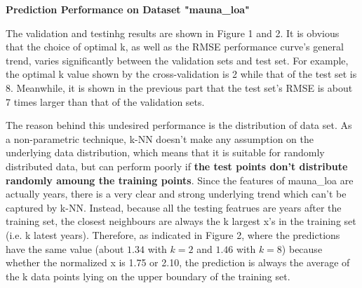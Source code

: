 \documentclass{article} %
\begin{document}
\vspace{0.2cm}

\textbf{Prediction Performance on Dataset "mauna\_loa"}

  The validation and testinhg results are shown in Figure 1 and 2. It is obvious that the choice of optimal k, as well as the RMSE performance curve's general trend, varies significantly between the validation sets and test set. For example, the optimal k value shown by the cross-validation is 2 while that of the test set is 8. Meanwhile, it is shown in the previous part that the test set's RMSE is about 7 times larger than that of the validation sets.


  The reason behind this undesired performance is the distribution of data set. As a non-parametric technique, k-NN doesn't make any assumption on the underlying data distribution, which means that it is suitable for randomly distributed data, but can perform poorly if \textbf{the test points don't distribute randomly amoung the training points}. Since the features of mauna\_loa are actually years, there is a very clear and strong underlying trend which can't be captured by k-NN. Instead, because all the testing featrues are years after the training set, the closest neighbours are always the k largest x's in the training set (i.e. k latest years). Therefore, as indicated in Figure 2, where the predictions have the same value (about $1.34$ with $k=2$ and $1.46$ with $k=8$) because whether the normalized x is 1.75 or 2.10, the prediction is always the average of the k data points lying on the upper boundary of the training set.
\end{document}
